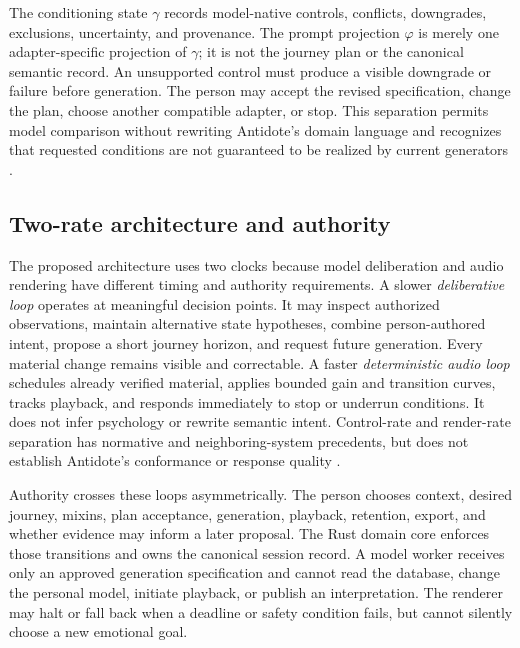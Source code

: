 The conditioning state $\gamma$ records model-native controls, conflicts,
downgrades, exclusions, uncertainty, and provenance. The prompt projection
$\varphi$ is merely
one adapter-specific projection of $\gamma$; it is not the journey plan or the
canonical semantic record. An unsupported control must produce a visible
downgrade or failure before generation. The person may accept the revised
specification, change the plan, choose another compatible adapter, or stop.
This separation permits model comparison without rewriting Antidote's domain
language and recognizes that requested conditions are not guaranteed to be
realized by current generators \citep{melechovsky2024mustango,tal2024jasco}.


\subsection{Two-rate architecture and authority}
\label{sec:design-two-rate-architecture}

The proposed architecture uses two clocks because model deliberation and audio
rendering have different timing and authority requirements. A slower
\emph{deliberative loop} operates at meaningful decision points. It may inspect
authorized observations, maintain alternative state hypotheses, combine
person-authored intent, propose a short journey horizon, and request future
generation. Every material change remains visible and correctable. A faster
\emph{deterministic audio loop} schedules already verified material, applies
bounded gain and transition curves, tracks playback, and responds immediately
to stop or underrun conditions. It does not infer psychology or rewrite
semantic intent. Control-rate and render-rate separation has normative and
neighboring-system precedents, but does not establish Antidote's conformance or
response quality \citep{w3c2024webaudio,hutchings2020adaptive,
ehrlich2019closedloop}.

Authority crosses these loops asymmetrically. The person chooses context,
desired journey, mixins, plan acceptance, generation, playback, retention,
export, and whether evidence may inform a later proposal. The Rust domain core
enforces those transitions and owns the canonical session record. A model
worker receives only an approved generation specification and cannot read the
database, change the personal model, initiate playback, or publish an
interpretation. The renderer may halt or fall back when a deadline or safety
condition fails, but cannot silently choose a new emotional goal.

